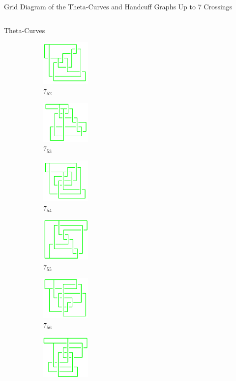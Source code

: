 \documentclass[final]{beamer}
\begin{document}
\begin{frame}[t]
\begin{alertblock}{Grid Diagram of the Theta-Curves and Handcuff Graphs Up to 7 Crossings}
\begin{columns}[t]
\begin{column}{0.6\textwidth}
\begin{alertblock}{Theta-Curves}
\begin{figure}
\begin{subfigure}{0.075\textwidth}
    \includegraphics[width=2.4cm]{../Midterm_Poster/grid_diagram/theta_7_52.png}
    \caption{$7_{52}$} 
    \end{subfigure}
    \begin{subfigure}{0.075\textwidth}
    \includegraphics[width=2.4cm]{../Midterm_Poster/grid_diagram/theta_7_53.png}
    \caption{$7_{53}$} 
    \end{subfigure}
    \begin{subfigure}{0.075\textwidth}
    \includegraphics[width=2.4cm]{../Midterm_Poster/grid_diagram/theta_7_54.png}
    \caption{$7_{54}$} 
    \end{subfigure}
    \begin{subfigure}{0.075\textwidth}
    \includegraphics[width=2.4cm]{../Midterm_Poster/grid_diagram/theta_7_55.png}
    \caption{$7_{55}$} 
    \end{subfigure}
    \begin{subfigure}{0.075\textwidth}
    \includegraphics[width=2.4cm]{../Midterm_Poster/grid_diagram/theta_7_56.png}
    \caption{$7_{56}$} 
    \end{subfigure}
    \begin{subfigure}{0.075\textwidth}
    \includegraphics[width=2.4cm]{../Midterm_Poster/grid_diagram/theta_7_57.png}

\end{subfigure}
\end{figure}
\end{alertblock}
\end{column}
\end{columns}
\end{alertblock}
\end{frame}
\end{document}
